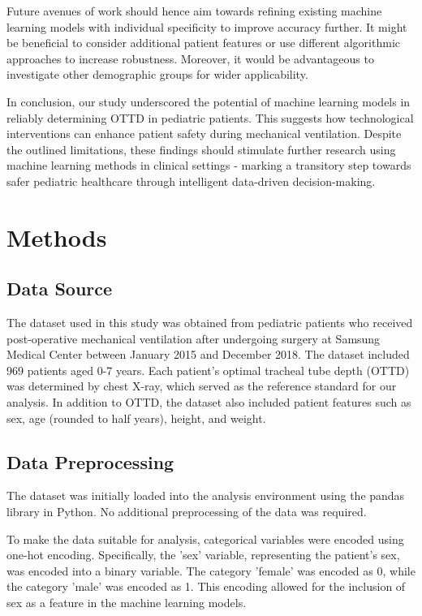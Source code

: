\documentclass[11pt]{article}
\begin{document}
Future avenues of work should hence aim towards refining existing machine learning models with individual specificity to improve accuracy further. It might be beneficial to consider additional patient features or use different algorithmic approaches to increase robustness. Moreover, it would be advantageous to investigate other demographic groups for wider applicability.

In conclusion, our study underscored the potential of machine learning models in reliably determining OTTD in pediatric patients. This suggests how technological interventions can enhance patient safety during mechanical ventilation. Despite the outlined limitations, these findings should stimulate further research using machine learning methods in clinical settings - marking a transitory step towards safer pediatric healthcare through intelligent data-driven decision-making.

\section*{Methods}

\subsection*{Data Source}
The dataset used in this study was obtained from pediatric patients who received post-operative mechanical ventilation after undergoing surgery at Samsung Medical Center between January 2015 and December 2018. The dataset included 969 patients aged 0-7 years. Each patient's optimal tracheal tube depth (OTTD) was determined by chest X-ray, which served as the reference standard for our analysis. In addition to OTTD, the dataset also included patient features such as sex, age (rounded to half years), height, and weight.

\subsection*{Data Preprocessing}
The dataset was initially loaded into the analysis environment using the pandas library in Python. No additional preprocessing of the data was required.

To make the data suitable for analysis, categorical variables were encoded using one-hot encoding. Specifically, the 'sex' variable, representing the patient's sex, was encoded into a binary variable. The category 'female' was encoded as 0, while the category 'male' was encoded as 1. This encoding allowed for the inclusion of sex as a feature in the machine learning models.
\end{document}
